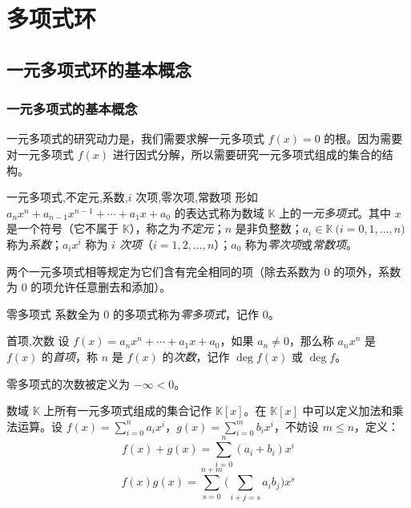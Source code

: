 
\chapter{多项式环}

\section{一元多项式环的基本概念}

\subsection{一元多项式的基本概念}

一元多项式的研究动力是，我们需要求解一元多项式 $f(x) = 0$ 的根。因为需要对一元多项式 $f(x)$ 进行因式分解，所以需要研究一元多项式组成的集合的结构。

\begin{definition}{一元多项式,不定元,系数,$i$ 次项,零次项,常数项}
	形如 $a_n x^n + a_{n - 1} x^{n - 1} + \cdots + a_1 x + a_0$ 的表达式称为数域 $\mathbb K$ 上的\emph{一元多项式}。其中 $x$ 是一个符号（它不属于 $\mathbb K$），称之为\emph{不定元}；$n$ 是非负整数；$a_i \in \mathbb K \pod{i = 0, 1, \ldots, n}$ 称为\emph{系数}；$a_i x^i$ 称为 \emph{$i$ 次项}（$i = 1, 2, \ldots, n$）；$a_0$ 称为\emph{零次项}或\emph{常数项}。
\end{definition}

两个一元多项式相等规定为它们含有完全相同的项（除去系数为 $0$ 的项外，系数为 $0$ 的项允许任意删去和添加）。

\begin{definition}{零多项式}
	系数全为 $0$ 的多项式称为\emph{零多项式}，记作 $0$。
\end{definition}

\begin{definition}{首项,次数}
	设 $f(x) = a_n x^n + \cdots + a_1 x + a_0$，如果 $a_n \ne 0$，那么称 $a_n x^n$ 是 $f(x)$ 的\emph{首项}，称 $n$ 是 $f(x)$ 的\emph{次数}，记作 $\deg f(x)$ 或 $\deg f$。
\end{definition}

零多项式的次数被定义为 $-\infty < 0$。

\bigskip

数域 $\mathbb K$ 上所有一元多项式组成的集合记作 $\mathbb K[x]$。在 $\mathbb K[x]$ 中可以定义加法和乘法运算。设 $f(x) = \sum\limits_{i = 0}^n a_i x^i$，$g(x) = \sum\limits_{i = 0}^m b_i x^i$，不妨设 $m \le n$，定义：
$$
f(x) + g(x) = \sum\limits_{i = 0}^n (a_i + b_i) x^i
$$$$
f(x) g(x) = \sum\limits_{s = 0}^{n + m} \biggl( \sum\limits_{i + j = s} a_i b_j \biggr) x^s
$$

